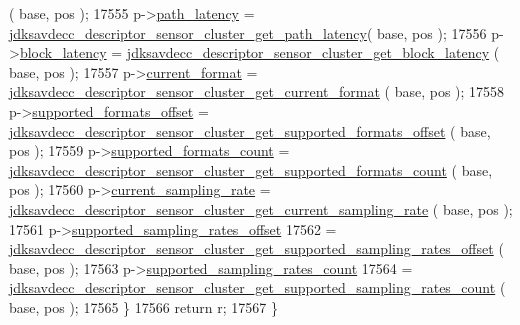 \begin{DoxyCode}
      ( base, pos );
17555         p->\hyperlink{structjdksavdecc__descriptor__sensor__unit__cluster_a5527ea1fa3f885e9d2264e450e1635fa}{path\_latency} = 
      \hyperlink{group__descriptor__sensor__cluster_gaa33f8462a17443fef613bb10be518a6a}{jdksavdecc\_descriptor\_sensor\_cluster\_get\_path\_latency}(
       base, pos );
17556         p->\hyperlink{structjdksavdecc__descriptor__sensor__unit__cluster_ae2e9f0088d5e900b610d1b2818dfc559}{block\_latency} = 
      \hyperlink{group__descriptor__sensor__cluster_gabeb6af76d38a76b0fb16eb57b0a1f290}{jdksavdecc\_descriptor\_sensor\_cluster\_get\_block\_latency}
      ( base, pos );
17557         p->\hyperlink{structjdksavdecc__descriptor__sensor__unit__cluster_ae56fc78e7074485bad557163524904c7}{current\_format} = 
      \hyperlink{group__descriptor__sensor__cluster_ga82e4d4b1ded3ffaa080decf283ed975d}{jdksavdecc\_descriptor\_sensor\_cluster\_get\_current\_format}
      ( base, pos );
17558         p->\hyperlink{structjdksavdecc__descriptor__sensor__unit__cluster_a3484053d0dc58698d796644a57273dcb}{supported\_formats\_offset} = 
      \hyperlink{group__descriptor__sensor__cluster_ga11c7e7b4ceed7086f16db4c177e2fd0c}{jdksavdecc\_descriptor\_sensor\_cluster\_get\_supported\_formats\_offset}
      ( base, pos );
17559         p->\hyperlink{structjdksavdecc__descriptor__sensor__unit__cluster_a3d054acc36c8fe6bc19ce257b4c18dfe}{supported\_formats\_count} = 
      \hyperlink{group__descriptor__sensor__cluster_ga5bf191e5f84714619a468b9c9c8e7f17}{jdksavdecc\_descriptor\_sensor\_cluster\_get\_supported\_formats\_count}
      ( base, pos );
17560         p->\hyperlink{structjdksavdecc__descriptor__sensor__unit__cluster_a081e14c5c832a659daf22003ed8e918d}{current\_sampling\_rate} = 
      \hyperlink{group__descriptor__sensor__cluster_gadd33e2ed17d74f29063cfaf47c6eda7a}{jdksavdecc\_descriptor\_sensor\_cluster\_get\_current\_sampling\_rate}
      ( base, pos );
17561         p->\hyperlink{structjdksavdecc__descriptor__sensor__unit__cluster_a07e4720cf58229a78c3c0939837b6228}{supported\_sampling\_rates\_offset}
17562             = 
      \hyperlink{group__descriptor__sensor__cluster_ga6569e845777ad42634c9f0b89cdf5483}{jdksavdecc\_descriptor\_sensor\_cluster\_get\_supported\_sampling\_rates\_offset}
      ( base, pos );
17563         p->\hyperlink{structjdksavdecc__descriptor__sensor__unit__cluster_a976ed67e20174bbc1a9988dc8f577fd8}{supported\_sampling\_rates\_count}
17564             = 
      \hyperlink{group__descriptor__sensor__cluster_ga6ca97d3665de32d7c1714d5f08165f46}{jdksavdecc\_descriptor\_sensor\_cluster\_get\_supported\_sampling\_rates\_count}
      ( base, pos );
17565     \}
17566     \textcolor{keywordflow}{return} r;
17567 \}
\end{DoxyCode}


